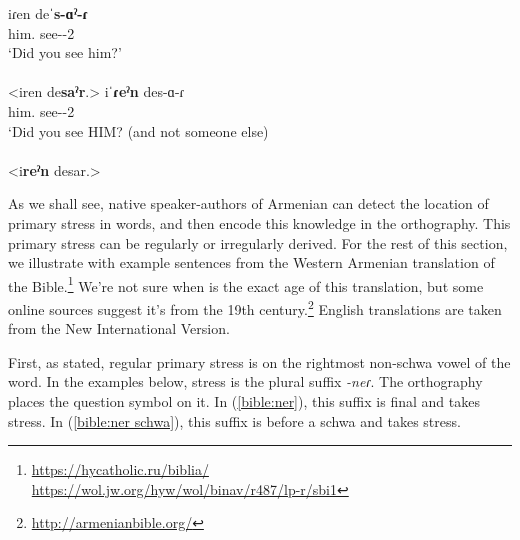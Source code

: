 \begin{exe}
	\ex 
	\begin{xlist}
		\ex \gll iɾen deˈ\textbf{s-ɑˀ-ɾ} \\
		him.{\dat} see-{\pst}-2{\sg} \\
		\trans `Did you see him?' \label{ex:question stress mrker}\\
		\\ <iren de\textbf{saˀr}.>
		\ex \gll iˈ\textbf{ɾeˀn} des-ɑ-ɾ \\
		him.{\dat} see-{\pst}-2{\sg} \\
		\trans `Did you see HIM? (and not  someone else) \label{ex:question stress mrker other}\\
		\\ <i\textbf{reˀn} desar.>
		
	\end{xlist}
\end{exe}

As we shall see, native speaker-authors of Armenian can detect the location of  primary stress in words, and then encode this knowledge in the orthography. This  primary stress can be regularly or irregularly derived. For the rest of this section, we illustrate with example sentences from the Western Armenian translation of the Bible.\footnote{\url{https://hycatholic.ru/biblia/}\\\url{https://wol.jw.org/hyw/wol/binav/r487/lp-r/sbi1}} We're not sure when is the exact age of this translation, but some online sources suggest it's from the 19th century.\footnote{\url{http://armenianbible.org/}} English translations are taken from the New International Version. 


First, as stated, regular primary stress is on the rightmost non-schwa vowel of the word. In the examples below, stress is the plural suffix \textit{-neɾ}. The orthography places the question symbol on it. In (\ref{bible:ner}), this suffix is final and takes stress. In (\ref{bible:ner schwa}), this suffix is before a schwa and takes stress. 

